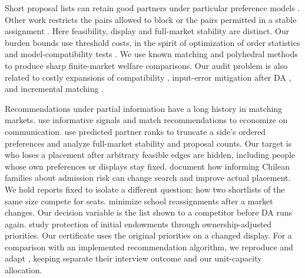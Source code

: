 \documentclass[format=acmsmall,review=false]{acmart}
\begin{document}
Short proposal lists can retain good partners under particular preference models \citep{shortlists}. Other work restricts the pairs allowed to block \citep{askalidis2013} or the pairs permitted in a stable assignment \citep{cseh2016restricted}. Here feasibility, display and full-market stability are distinct. Our burden bounds use threshold costs, in the spirit of optimization of order statistics and model-compatibility tests \citep{gorski2009,ekeland2010}. We use known matching and polyhedral methods to produce sharp finite-market welfare comparisons. Our audit problem is also related to costly expansions of compatibility \citep{facilitate}, input-error mitigation after DA \citep{postmatch}, and incremental matching \citep{incremental}.

Recommendations under partial information have a long history in matching markets. \citet{signals} use informative signals and match recommendations to economize on communication. \citet{pruned} use predicted partner ranks to truncate a side's ordered preferences and analyze full-market stability and proposal counts. Our target is who loses a placement after arbitrary feasible edges are hidden, including people whose own preferences or displays stay fixed. \citet{smartplatforms} document how informing Chilean families about admission risk can change search and improve actual placement. We hold reports fixed to isolate a different question: how two shortlists of the same size compete for seats. \citet{tworound} minimize school reassignments after a market changes. Our decision variable is the list shown to a competitor before DA runs again. \citet{reallocation} study protection of initial endowments through ownership-adjusted priorities. Our certificate uses the original priorities on a changed display. For a comparison with an implemented recommendation algorithm, we reproduce and adapt \citet{rankings}, keeping separate their interview outcome and our unit-capacity allocation.
\end{document}
